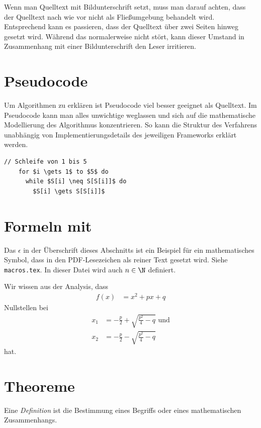 Wenn man Quelltext mit Bildunterschrift setzt, muss man darauf achten, dass der Quelltext nach wie vor nicht als Fließumgebung behandelt wird. Entsprechend kann es passieren, dass der Quelltext über zwei Seiten hinweg gesetzt wird. Während das normalerweise nicht stört, kann dieser Umstand in Zusammenhang mit einer Bildunterschrift den Leser irritieren.

\section{Pseudocode}

Um Algorithmen zu erklären ist Pseudocode viel besser geeignet als Quelltext. Im Pseudocode kann man alles unwichtige weglassen und sich auf die mathematische Modellierung des Algorithmus konzentrieren. So kann die Struktur des Verfahrens unabhängig von Implementierungsdetails des jeweiligen Frameworks erklärt werden.

\begin{lstlisting}[style=pseudo,gobble=2]
  // Schleife von 1 bis 5
    for $i \gets 1$ to $5$ do
      while $S[i] \neq S[S[i]]$ do
        $S[i] \gets S[S[i]]$
\end{lstlisting}

\section{Formeln mit \pdfepsilon}

Das $\epsilon$ in der Überschrift dieses Abschnitts ist ein Beispiel für ein mathematisches Symbol, dass in den PDF-Lesezeichen als reiner Text gesetzt wird. Siehe \texttt{macros.tex}. In dieser Datei wird auch $n \in \N$ definiert.

Wir wissen aus der Analysis, dass
\begin{align}
  f(x) &= x^2 + px + q
\end{align}
Nullstellen bei
\begin{align}
  x_1 &= -\frac p2 + \sqrt{\frac{p^2}4 - q} \text{ und}\\
  x_2 &= -\frac p2 - \sqrt{\frac{p^2}4 - q}
\end{align}
hat.

\section{Theoreme}

\begin{Definition}[Definition]
  Eine \emph{Definition} ist die Bestimmung eines Begriffs oder eines mathematischen Zusammenhangs.
\end{Definition}

